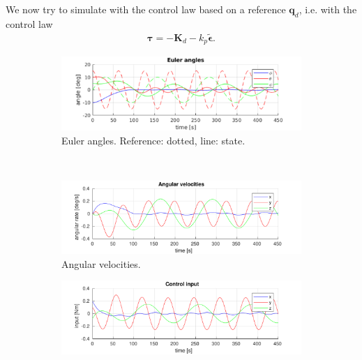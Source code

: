 \subsection{}
We now try to simulate with the control law based on a reference $\mathbf{q}_d$, i.e. with the control law
\begin{equation}\begin{aligned}
\label{eq:control_law_error}
\boldsymbol{\tau} = - \mathbf{K}_d -k_p \tilde{\boldsymbol{\epsilon}}.
\end{aligned}\end{equation}
\begin{figure}[H]
	\centering
	\begin{subfigure}[b]{0.45\textwidth}
		\includegraphics[width=\textwidth]{../matlab/1_5_euler_angles}
		\caption{Euler angles. Reference: dotted, line: state.}
		\label{fig:5a}
	\end{subfigure}
	~ %
	\begin{subfigure}[b]{0.45\textwidth}
		\includegraphics[width=\textwidth]{../matlab/1_5_angular_velocities}
		\caption{Angular velocities.}
		\label{fig:5b}
	\end{subfigure}
	\begin{subfigure}[b]{0.45\textwidth}
		\includegraphics[width=\textwidth]{../matlab/1_5_control_input}

\end{subfigure}
\end{figure}
